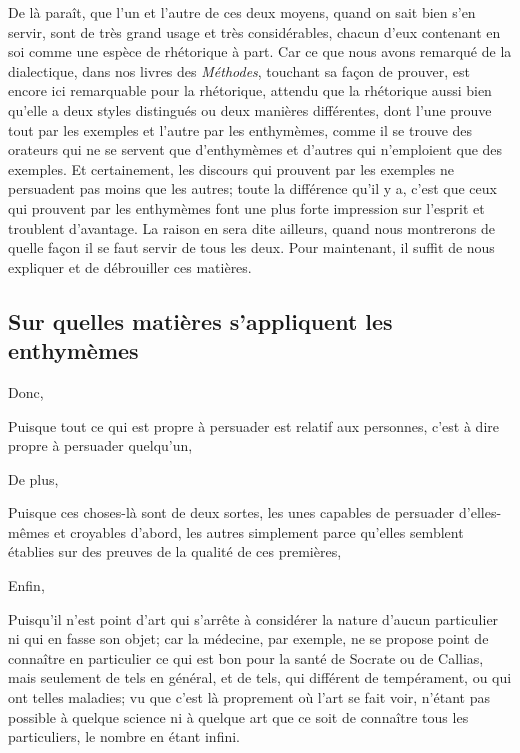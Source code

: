 De là paraît, que l'un et l'autre de ces deux moyens, quand on sait bien s'en servir, sont de très grand usage et très considérables, chacun d'eux contenant
en soi comme une espèce de rhétorique à part. Car ce que nous avons remarqué de la dialectique, dans nos livres des \emph{Méthodes}, touchant sa façon de prouver,
est encore ici remarquable pour la rhétorique, attendu que la rhétorique aussi bien qu'elle a deux styles distingués ou deux manières différentes, dont l'une prouve
tout par les exemples et l'autre par les enthymèmes, comme il se trouve des orateurs qui ne se servent que d'enthymèmes et d'autres qui n'emploient que des exemples.
Et certainement, les discours qui prouvent par les exemples ne persuadent pas moins que les autres; toute la différence qu'il y a, c'est que ceux qui prouvent par
les enthymèmes font une plus forte impression sur l'esprit et troublent d'avantage. La raison en sera dite ailleurs, quand nous montrerons de quelle façon il se faut
servir de tous les deux. Pour maintenant, il suffit de nous expliquer et de débrouiller ces matières.

\subsection{Sur quelles matières s'appliquent les enthymèmes}

Donc,

\begin{emphpar}
     Puisque tout ce qui est propre à persuader est relatif aux personnes, c'est à dire propre à persuader quelqu'un,
\end{emphpar}

De plus,

\begin{emphpar}
     Puisque ces choses-là sont de deux sortes, les unes capables de persuader d'elles-mêmes et croyables d'abord, les
      autres simplement parce qu'elles semblent établies sur des preuves de la qualité de ces premières,
\end{emphpar}

Enfin,

\begin{emphpar}
     Puisqu'il n'est point d'art qui s'arrête à considérer la nature d'aucun particulier ni qui en fasse son objet; car
      la médecine, par exemple, ne se propose point de connaître en particulier ce qui est bon pour la santé de Socrate ou
      de Callias, mais seulement de tels en général, et de  tels, qui différent de tempérament, ou qui ont telles maladies;
      vu que c'est là proprement où l'art se fait voir, n'étant pas possible à quelque science ni à quelque art que ce soit
      de connaître tous les particuliers, le nombre en étant infini.
\end{emphpar}


